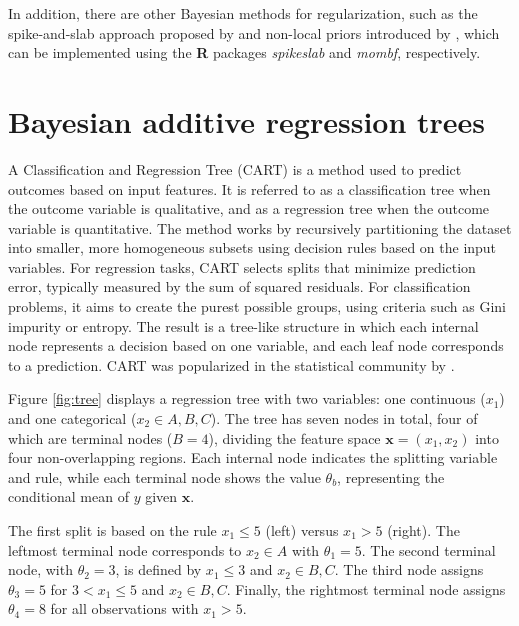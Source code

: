 In addition, there are other Bayesian methods for regularization, such as the spike-and-slab approach proposed by \cite{Ishwaran2005} and non-local priors introduced by \cite{johnson2012bayesian}, which can be implemented using the \textbf{R} packages \textit{spikeslab} and \textit{mombf}, respectively.



\section{Bayesian additive regression trees}\label{sec13_3}

A Classification and Regression Tree (CART) is a method used to predict outcomes based on input features. It is referred to as a classification tree when the outcome variable is qualitative, and as a regression tree when the outcome variable is quantitative. The method works by recursively partitioning the dataset into smaller, more homogeneous subsets using decision rules based on the input variables. For regression tasks, CART selects splits that minimize prediction error, typically measured by the sum of squared residuals. For classification problems, it aims to create the purest possible groups, using criteria such as Gini impurity or entropy. The result is a tree-like structure in which each internal node represents a decision based on one variable, and each leaf node corresponds to a prediction. CART was popularized in the statistical community by \cite{breiman1984classification}.

Figure \ref{fig:tree} displays a regression tree with two variables: one continuous ($x_1$) and one categorical ($x_2 \in {A, B, C}$). The tree has seven nodes in total, four of which are terminal nodes ($B = 4$), dividing the feature space $\mathbf{x} = (x_1, x_2)$ into four non-overlapping regions. Each internal node indicates the splitting variable and rule, while each terminal node shows the value $\theta_b$, representing the conditional mean of $y$ given $\mathbf{x}$.

The first split is based on the rule $x_1 \leq 5$ (left) versus $x_1 > 5$ (right). The leftmost terminal node corresponds to $x_2 \in {A}$ with $\theta_1 = 5$. The second terminal node, with $\theta_2 = 3$, is defined by $x_1 \leq 3$ and $x_2 \in {B, C}$. The third node assigns $\theta_3 = 5$ for $3 < x_1 \leq 5$ and $x_2 \in {B, C}$. Finally, the rightmost terminal node assigns $\theta_4 = 8$ for all observations with $x_1 > 5$.

